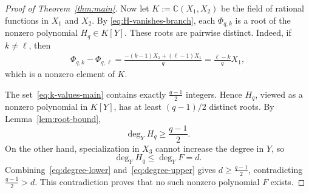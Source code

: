 \documentclass[10pt,a4paper]{amsart}
\newcommand{\CC}{\mathbb{C}}
\begin{document}
\begin{proof}[Proof of Theorem~\ref{thm:main}]
Now let $K:=\CC(X_1,X_2)$ be the field of rational functions in $X_1$ and $X_2$.  By
\cref{eq:H-vanishes-branch}, each $\Phi_{q,k}$ is a root of the nonzero
polynomial $H_q\in K[Y]$.  These roots are pairwise distinct.  Indeed, if
$k\neq\ell$, then
\begin{align*}
\Phi_{q,k}-\Phi_{q,\ell}=\frac{-(k-1)X_1+(\ell-1)X_1}{q}=\frac{\ell-k}{q}X_1,
\end{align*}
which is a nonzero element of $K$.

The set~\cref{eq:k-values-main} contains exactly $\frac{q-1}{2}$ integers.  Hence $H_q$, viewed as a nonzero polynomial in $K[Y]$, has at least $(q-1)/2$ distinct roots.  By Lemma~\ref{lem:root-bound},
\begin{equation}\label{eq:degree-lower}
  \deg_Y H_q\ge\frac{q-1}{2}.
\end{equation}
On the other hand, specialization in $X_3$ cannot increase the degree in
$Y$, so
\begin{equation}\label{eq:degree-upper}
  \deg_Y H_q\le\deg_Y F=d.
\end{equation}
Combining~\cref{eq:degree-lower} and~\cref{eq:degree-upper} gives $d\ge\frac{q-1}{2}$, contradicting~$\frac{q-1}{2}>d$.  This contradiction proves that no such nonzero polynomial $F$ exists.
\end{proof}
\end{document}
